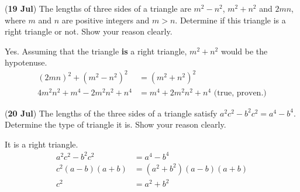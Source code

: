 \documentclass[12pt,answers]{exam}
\newcommand{\qndate}[2]{(\textbf{#1 #2})}
\begin{document}
\begin{questions}
	\question \qndate{19}{Jul} The lengths of three sides of a triangle are $m^2-n^2$,
	$m^2+n^2$ and $2mn$, where $m$ and $n$ are positive integers and $m>n$. Determine
	if this triangle is a right triangle or not. Show your reason clearly.
	\begin{solution}
		Yes. Assuming that the triangle \textbf{is} a right triangle,
		$m^2+n^2$ would be the hypotenuse.
		\begin{align*}
			{\left(2mn\right)}^2 + {\left(m^2 - n^2\right)}^2 & = {\left(m^2+n^2\right)}^2                    \\
			4m^2n^2 + m^4 - 2m^2n^2 + n^4                     & = m^4 + 2m^2n^2 + n^4 \text{ (true, proven.)}
		\end{align*}
	\end{solution}

	\question \qndate{20}{Jul} The lengths of the three sides of a triangle satisfy
	$a^2c^2 - b^2c^2 = a^4-b^4$. Determine the type of triangle it is. Show your reason
	clearly.
	\begin{solution}
		It is a right triangle.
		\begin{align*}
			a^2c^2 - b^2c^2                     & = a^4-b^4                                              \\
			c^2\left(a-b\right)\left(a+b\right) & = \left(a^2+b^2\right)\left(a-b\right)\left(a+b\right) \\
			c^2                                 & = a^2 + b^2
		\end{align*}
	\end{solution}


\end{questions}
\end{document}
